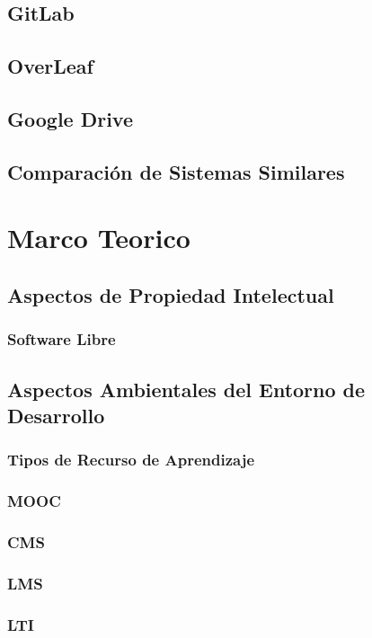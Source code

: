 \subsection{GitLab}
\subsection{OverLeaf}
\subsection{Google Drive}
\subsection{Comparación de Sistemas Similares}

\section{Marco Teorico}

\subsection{Aspectos de Propiedad Intelectual}

\subsubsection{Software Libre}

\subsection{Aspectos Ambientales del Entorno de Desarrollo}

\subsubsection{Tipos de Recurso de Aprendizaje}

\subsubsection{MOOC}
\subsubsection{CMS}
\subsubsection{LMS}
\subsubsection{LTI}

